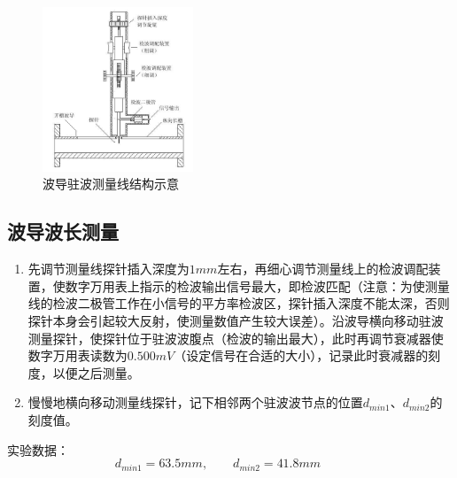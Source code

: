 \documentclass{../source/Experiment}
\begin{document}
            \begin{figure}[H]
                \centering
                \includegraphics[width = 0.4\textwidth]{pic/波导驻波测量线结构示意}
                \caption{波导驻波测量线结构示意}
            \end{figure}

        \subsection{波导波长测量}
            \begin{enumerate}
                \item 先调节测量线探针插入深度为$1mm $左右，再细心调节测量线上的检波调配装置，使数字万用表上指示的检波输出信号最大，即检波匹配（注意：为使测量线的检波二极管工作在小信号的平方率检波区，探针插入深度不能太深，否则探针本身会引起较大反射，使测量数值产生较大误差）。沿波导横向移动驻波测量探针，使探针位于驻波波腹点（检波的输出最大），此时再调节衰减器使数字万用表读数为$0.500mV$（设定信号在合适的大小），记录此时衰减器的刻度，以便之后测量。
                \item 慢慢地横向移动测量线探针，记下相邻两个驻波波节点的位置$d_{min1}$、$d_{min2}$的刻度值。
            \end{enumerate}
            实验数据：$$d_{min1} = 63.5mm, \qquad d_{min2} =41.8mm \qquad$$
\end{document}
